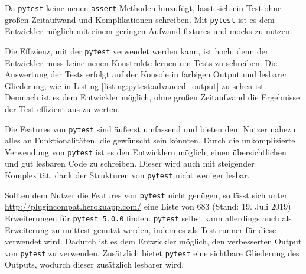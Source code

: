 Da \lstinline{pytest} keine neuen \lstinline{assert} Methoden hinzufügt, lässt
sich ein Test ohne großen Zeitaufwand und Komplikationen schreiben. Mit
\lstinline{pytest} ist es dem Entwickler möglich mit einem geringen Aufwand
\Glspl{fixture} und \Glspl{mock} zu nutzen.

Die Effizienz, mit der \lstinline{pytest} verwendet werden kann, ist hoch, denn
der Entwickler muss keine neuen Konstrukte lernen um Tests zu schreiben. Die
Auswertung der Tests erfolgt auf der Konsole in farbigen Output und lesbarer
Gliederung, wie in Listing \ref{listing:pytest:advanced_output} zu sehen ist.
Demnach ist es dem Entwickler möglich, ohne großen Zeitaufwand die Ergebnisse
der Test effizient aus zu werten.

Die Features von \lstinline{pytest} sind äußerst umfassend und bieten dem Nutzer
nahezu alles an Funktionalitäten, die gewünscht sein könnten. Durch die
unkomplizierte Verwendung von \lstinline{pytest} ist es den Entwicklern möglich,
einen übersichtlichen und gut lesbaren Code zu schreiben. Dieser wird auch mit
steigender Komplexität, dank der Strukturen von \lstinline{pytest} nicht weniger
lesbar.

Sollten dem Nutzer die Features von \lstinline{pytest} nicht genügen, so lässt
sich unter \url{http://plugincompat.herokuapp.com/} eine Liste von 683 (Stand:
19. Juli 2019) Erweiterungen für \lstinline{pytest 5.0.0} finden.
\lstinline{pytest} selbst kann allerdings auch als Erweiterung zu unittest
genutzt werden, indem es als Test-runner für diese verwendet wird. Dadurch ist
es dem Entwickler möglich, den verbesserten Output von \lstinline{pytest} zu
verwenden. Zusätzlich bietet \lstinline{pytest} eine sichtbare Gliederung des
Outputs, wodurch dieser zusätzlich lesbarer wird.